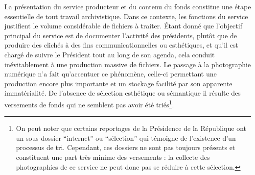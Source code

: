 La présentation du service producteur et du contenu du fonds constitue une étape essentielle de tout travail archivistique. Dans ce contexte, les fonctions du service justifient le volume considérable de fichiers à traiter. Étant donné que l'objectif principal du service est de documenter l'activité des présidents, plutôt que de produire des clichés à des fins communicationnelles ou esthétiques, et qu'il est chargé de suivre le Président tout au long de son agenda, cela conduit inévitablement à une production massive de fichiers. Le passage à la photographie numérique n'a fait qu'accentuer ce phénomène, celle-ci permettant une production encore plus importante et un stockage facilité par son apparente immatérialité. De l'absence de sélection esthétique ou sémantique il résulte des versements de fonds qui ne semblent pas avoir été triés\footnote{On peut noter que certains reportages de la Présidence de la République ont un sous-dossier \enquote{internet} ou \enquote{sélection} qui témoigne de l'existence d'un processus de tri. Cependant, ces dossiers ne sont pas toujours présents et constituent une part très minime des versements :  la collecte des photographies de ce service ne peut donc pas se réduire à cette sélection.}.